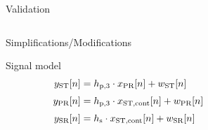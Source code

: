 \documentclass[16pt]{beamer}
\newcommand{\fs}[2]{\fontsize{#1 pt}{#2}\selectfont}
\begin{document}
\begin{frame}[t]{Validation}
\begin{columns}
\begin{column}{0.45\columnwidth}
{\begin{block}{\footnotesize Simplifications/Modifications}
\begin{itemize}
				\end{itemize}				
			\end{block}
			\vspace{3mm}
			\begin{block}{\footnotesize Signal model}
				\vspace{-3mm}
				\begin{align*}
					y_{\text{ST}}[n] &= h_{\text{p,3}} \cdot x_{\text{PR}}[n] + w_{\text{ST}}[n] \\[0.3em]
					y_{\text{PR}}[n] &= h_{\text{p,3}} \cdot x_{\text{ST,cont}}[n] + w_{\text{PR}}[n] \\[0.3em]
					y_{\text{SR}}[n] &= h_{\text{s}} \cdot x_{\text{ST,cont}}[n] + w_{\text{SR}}[n]
				\end{align*}
			\end{block} 
			}

		\end{column}
		\begin{column}{0.55\columnwidth}
		\fs{7}{8}
			\begin{overlayarea}{\textwidth}{3.8cm}

\end{overlayarea}
\end{column}
\end{columns}
\end{frame}
\end{document}
